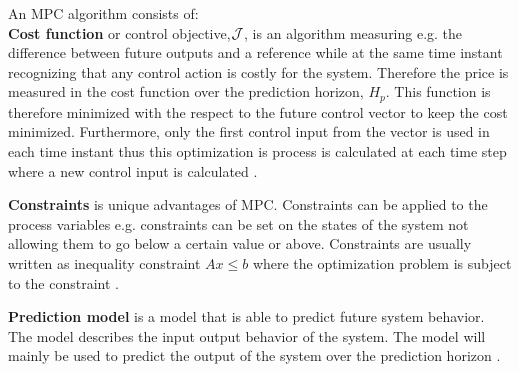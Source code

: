 An MPC algorithm consists of:
\\ 
\textbf{Cost function} or control objective,$\CMcal{J}$, is an algorithm measuring e.g. the difference between future outputs and a reference while at the same time instant recognizing that any control action is costly for the system. Therefore the price is measured in the cost function over the prediction horizon, $H_p$. This function is therefore minimized with the respect to the future control vector to keep the cost minimized. Furthermore, only the first control input from the vector is used in each time instant thus this optimization is process is calculated at each time step where a new control input is calculated \cite{mpc_control_lecture_notes}.

\textbf{Constraints} is unique advantages of MPC. Constraints can be applied to the process variables e.g. constraints can be set on the states of the system not allowing them to go below a certain value or above. Constraints are usually written as inequality constraint $Ax\leq b$ where the optimization problem is subject to the constraint \cite{mpc_control_lecture_notes}.   

\textbf{Prediction model} is a model that is able to predict future system behavior. The model describes the input output behavior of the system. The model will mainly be used to predict the output of the system over the prediction horizon \cite{mpc_control_lecture_notes}.  






